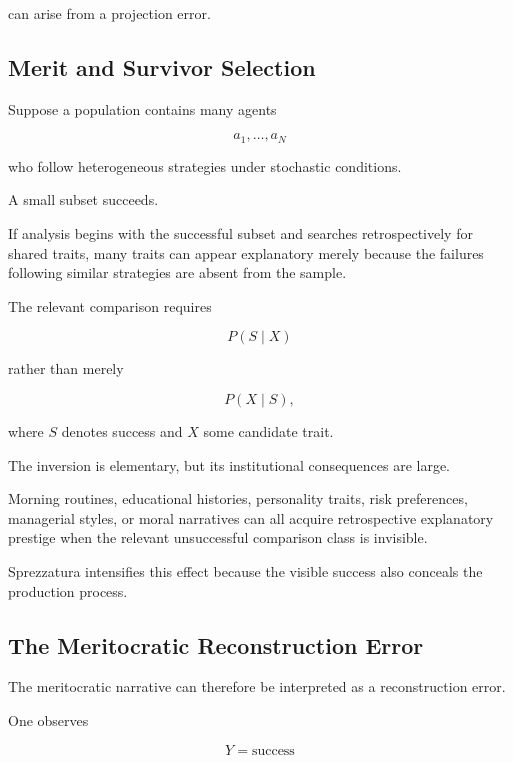\documentclass[11pt]{article}
\theoremstyle{remark}
\begin{document}
can arise from a projection error.

\subsection{Merit and Survivor Selection}

Suppose a population contains many agents

\begin{equation}
a_1,\ldots,a_N
\end{equation}

who follow heterogeneous strategies under stochastic conditions.

A small subset succeeds.

If analysis begins with the successful subset and searches retrospectively for shared traits, many traits can appear explanatory merely because the failures following similar strategies are absent from the sample.

The relevant comparison requires

\begin{equation}
P(S\mid X)
\end{equation}

rather than merely

\begin{equation}
P(X\mid S),
\end{equation}

where $S$ denotes success and $X$ some candidate trait.

The inversion is elementary, but its institutional consequences are large.

Morning routines, educational histories, personality traits, risk preferences, managerial styles, or moral narratives can all acquire retrospective explanatory prestige when the relevant unsuccessful comparison class is invisible.

Sprezzatura intensifies this effect because the visible success also conceals the production process.

\subsection{The Meritocratic Reconstruction Error}

The meritocratic narrative can therefore be interpreted as a reconstruction error.

One observes

\begin{equation}
Y=\text{success}
\end{equation}
\end{document}
